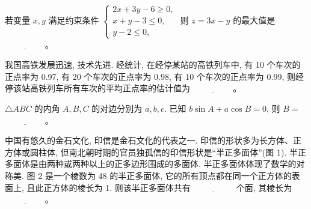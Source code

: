 \begin{question}
若变量 $x, y$ 满足约束条件 $\begin{cases} 2x + 3y - 6 \geqslant 0, \\ x + y - 3 \leqslant 0, \\ y - 2 \leqslant 0, \end{cases}$ 则 $z = 3x - y$ 的最大值是 $\underline{\hspace{2cm}}$。

\end{question}
\begin{question}
我国高铁发展迅速, 技术先进. 经统计, 在经停某站的高铁列车中, 有 10 个车次的正点率为 0.97, 有 20 个车次的正点率为 0.98, 有 10 个车次的正点率为 0.99, 则经停该站高铁列车所有车次的平均正点率的估计值为 $\underline{\hspace{2cm}}$。

\end{question}
\begin{question}
$\triangle ABC$ 的内角 $A, B, C$ 的对边分别为 $a, b, c$. 已知 $b\sin A + a\cos B = 0$, 则 $B =$ $\underline{\hspace{2cm}}$。

\Needspace{0.4\textheight}
\end{question}
\begin{question}
中国有悠久的金石文化, 印信是金石文化的代表之一. 印信的形状多为长方体、正方体或圆柱体, 但南北朝时期的官员独孤信的印信形状是“半正多面体”(图 1). 半正多面体是由两种或两种以上的正多边形围成的多面体. 半正多面体体现了数学的对称美. 图 2 是一个棱数为 48 的半正多面体, 它的所有顶点都在同一个正方体的表面上, 且此正方体的棱长为 1. 则该半正多面体共有 $\underline{\hspace{2cm}}$ 个面, 其棱长为 $\underline{\hspace{2cm}}$。
\nopagebreak[4]
\begin{center}\end{center}
\nopagebreak[4]
\par\medskip

\end{question}


